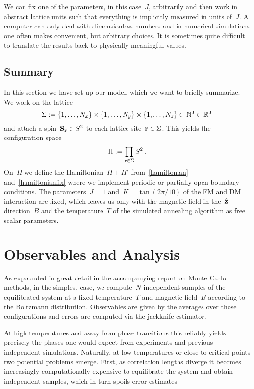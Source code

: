 We can fix one of the parameters, in this case~$J$, arbitrarily and then work in
abstract lattice units such that everything is implicitly measured in units
of~$J$. A computer can only deal with dimensionless numbers and in numerical
simulations one often makes convenient, but arbitrary choices. It is sometimes
quite difficult to translate the results back to physically meaningful values.

\subsection{Summary}

In this section we have set up our model, which we want to briefly summarize. We
work on the lattice
%
\begin{equation}
  \Sigma := \{1,\dots,N_x\} \times \{1,\dots,N_y\} \times
  \{1,\dots,N_z\} \subset \mathbb{N}^3 \subset \mathbb{R}^3\:
\end{equation}
%
and attach a spin~$\mathbf{S}_{\mathbf{r}} \in S^2$ to each lattice site~$\mathbf{r} \in \Sigma$. This
yields the configuration space
%
\begin{equation}
  \Pi := \prod_{\mathbf{r} \in \Sigma} S^2\:.
\end{equation}
%
On~$\Pi$ we define the Hamiltonian~$H+H'$ from~\eqref{hamiltonian}
and~\eqref{hamiltonianfix} where we implement periodic or partially open
boundary conditions. The parameters~$J=1$ and~$K=\tan(2\pi / 10)$ of the FM and
DM interaction are fixed, which leaves us only with the magnetic field in
the~$\hat{\mathbf{z}}$ direction~$B$ and the temperature~$T$ of the simulated annealing
algorithm as free scalar parameters.
%
\section{Observables and Analysis}\label{sec:analysis}
%
As expounded in great detail in the accompanying report on Monte Carlo methods,
in the simplest case, we compute~$N$ independent samples of the equilibrated
system at a fixed temperature~$T$ and magnetic field~$B$ according to the
Boltzmann distribution. Observables are given by the averages over those
configurations and errors are computed via the jackknife estimator.

At high temperatures and away from phase transitions this reliably yields
precisely the phases one would expect from experiments and previous independent
simulations. Naturally, at low temperatures or close to critical points two
potential problems emerge. First, as correlation lengths diverge it becomes
increasingly computationally expensive to equilibrate the system and obtain
independent samples, which in turn spoils error estimates.

